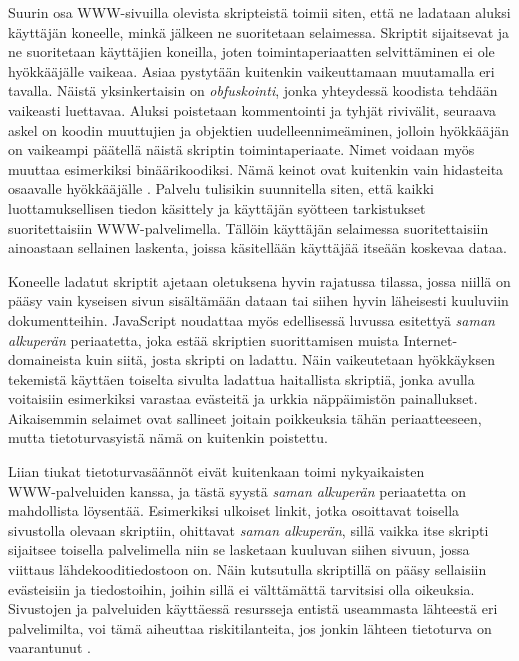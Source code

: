 Suurin osa WWW-sivuilla olevista skripteistä toimii siten, että ne
ladataan aluksi käyttäjän koneelle, minkä jälkeen ne suoritetaan
selaimessa. Skriptit sijaitsevat ja ne suoritetaan käyttäjien
koneilla, joten toimintaperiaatten selvittäminen ei ole hyökkääjälle
vaikeaa. Asiaa pystytään kuitenkin vaikeuttamaan muutamalla eri
tavalla. Näistä yksinkertaisin on \emph{obfuskointi}, jonka yhteydessä
koodista tehdään vaikeasti luettavaa. Aluksi poistetaan kommentointi
ja tyhjät rivivälit, seuraava askel on koodin muuttujien ja objektien
uudelleennimeäminen, jolloin hyökkääjän on vaikeampi päätellä näistä
skriptin toimintaperiaate. Nimet voidaan myös muuttaa esimerkiksi
binäärikoodiksi. Nämä keinot ovat kuitenkin vain hidasteita osaavalle
hyökkääjälle \cite{AJAX}. Palvelu tulisikin suunnitella siten, että
kaikki luottamuksellisen tiedon käsittely ja käyttäjän syötteen
tarkistukset suoritettaisiin WWW-palvelimella. Tällöin käyttäjän
selaimessa suoritettaisiin ainoastaan sellainen laskenta, joissa
käsitellään käyttäjää itseään koskevaa dataa.

Koneelle ladatut skriptit ajetaan oletuksena hyvin rajatussa tilassa,
jossa niillä on pääsy vain kyseisen sivun sisältämään dataan tai
siihen hyvin läheisesti kuuluviin dokumentteihin. JavaScript noudattaa
myös \ifdefined\seminaari \relax \else edellisessä luvussa esitettyä
\fi \emph{saman alkuperän} periaatetta, joka estää skriptien
suorittamisen muista In\-ter\-net-do\-mai\-neis\-ta kuin siitä, josta skripti on
ladattu. Näin vaikeutetaan hyökkäyksen tekemistä käyttäen
toiselta sivulta ladattua haitallista skriptiä, jonka avulla
voitaisiin esimerkiksi varastaa evästeitä ja urkkia näppäimistön
painallukset.  Aikaisemmin selaimet ovat sallineet joitain poikkeuksia
tähän periaatteeseen, mutta tietoturvasyistä nämä on kuitenkin
poistettu.

Liian tiukat tietoturvasäännöt eivät kuitenkaan toimi nykyaikaisten\\
WWW-palveluiden kanssa, ja tästä syystä \emph{saman alkuperän}
periaatetta on mahdollista löysentää. Esimerkiksi ulkoiset linkit,
jotka osoittavat toisella sivustolla olevaan skriptiin, ohittavat
\emph{saman alkuperän}, sillä vaikka itse skripti sijaitsee toisella
palvelimella niin se lasketaan kuuluvan siihen sivuun, jossa viittaus
lähdekooditiedostoon on.  Näin kutsutulla skriptillä on pääsy
sellaisiin evästeisiin ja tiedostoihin, joihin sillä ei välttämättä
tarvitsisi olla oikeuksia. Sivustojen ja palveluiden käyttäessä
resursseja entistä useammasta lähteestä eri palvelimilta, voi tämä
aiheuttaa riskitilanteita, jos jonkin lähteen tietoturva on
vaarantunut \cite{AJAX}.

